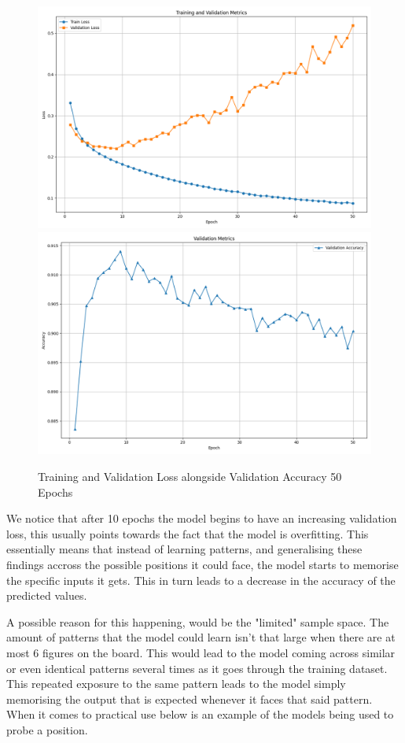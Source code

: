 \begin{figure}[H]
    \centering
    \includegraphics[scale=0.35]{images/50EpochTrainValLoss.png}
    \includegraphics[scale=0.35]{images/50EpochValAcc.png}
    \caption{Training and Validation Loss alongside Validation Accuracy 50 Epochs}
    \label{fig: 50epoch Metrics}
\end{figure}

We notice that after 10 epochs the model begins to have an increasing validation loss, this usually points towards the fact that the model is overfitting. This essentially means that instead of learning patterns, and generalising these findings accross the possible positions it could face, the model starts to memorise the specific inputs it gets. This in turn leads to a decrease in the accuracy of the predicted values.

A possible reason for this happening, would be the "limited" sample space. The amount of patterns that the model could learn isn't that large when there are at most 6 figures on the board. This would lead to the model coming across similar or even identical patterns several times as it goes through the training dataset. This repeated exposure to the same pattern leads to the model simply memorising the output that is expected whenever it faces that said pattern.
\newpage
When it comes to practical use below is an example of the models being used to probe a position.

